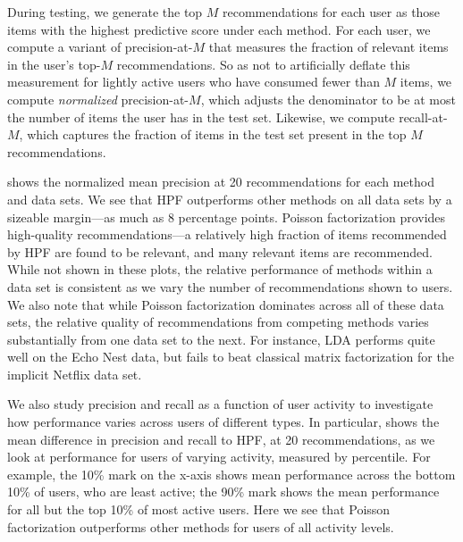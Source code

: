 During testing, we generate the top $M$ recommendations for each user
as those items with the highest predictive score under each
method. For each user, we compute a variant of precision-at-$M$ that
measures the fraction of relevant items in the user's top-$M$
recommendations. So as not to artificially deflate this measurement
for lightly active users who have consumed fewer than $M$ items, we
compute {\it normalized} precision-at-$M$, which adjusts the
denominator to be at most the number of items the user has in the
test set. Likewise, we compute recall-at-$M$, which captures the
fraction of items in the test set present in the top $M$
recommendations.


 shows the normalized mean precision at 20
recommendations for each method and data sets. We see that HPF
outperforms other methods on all data sets by a sizeable margin---as
much as 8 percentage points. Poisson factorization provides
high-quality recommendations---a relatively high fraction of items
recommended by HPF are found to be relevant, and many relevant items
are recommended. While not shown in these plots, the relative
performance of methods within a data set is consistent as we vary the
number of recommendations shown to users. We also note that while
Poisson factorization dominates across all of these data sets, the
relative quality of recommendations from competing methods varies
substantially from one data set to the next. For instance, LDA
performs quite well on the Echo Nest data, but fails to beat classical
matrix factorization for the implicit Netflix data set.

We also study precision and recall as a function of user activity to
investigate how performance varies across users of different types. In
particular,  shows the mean
difference in precision and recall to HPF, at 20 recommendations, as
we look at performance for users of varying activity, measured by
percentile. For example, the 10\% mark on the x-axis shows mean
performance across the bottom 10\% of users, who are least active; the
90\% mark shows the mean performance for all but the top 10\% of most
active users. Here we see that Poisson factorization outperforms other
methods for users of all activity levels.

